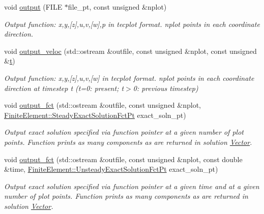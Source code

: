\begin{DoxyCompactItemize}
void \hyperlink{classoomph_1_1GeneralisedNewtonianAxisymmetricNavierStokesEquations_a9aae32c881c1c55c2d20c579bf5438f7}{output} (F\+I\+LE $\ast$file\+\_\+pt, const unsigned \&nplot)
\begin{DoxyCompactList}\small\item\em Output function\+: x,y,\mbox{[}z\mbox{]},u,v,\mbox{[}w\mbox{]},p in tecplot format. nplot points in each coordinate direction. \end{DoxyCompactList}\item 
void \hyperlink{classoomph_1_1GeneralisedNewtonianAxisymmetricNavierStokesEquations_a6d1a6a907d2a90a45c50ef8ced117b6d}{output\+\_\+veloc} (std\+::ostream \&outfile, const unsigned \&nplot, const unsigned \&\hyperlink{cfortran_8h_af6f0bd3dc13317f895c91323c25c2b8f}{t})
\begin{DoxyCompactList}\small\item\em Output function\+: x,y,\mbox{[}z\mbox{]},u,v,\mbox{[}w\mbox{]} in tecplot format. nplot points in each coordinate direction at timestep t (t=0\+: present; t$>$0\+: previous timestep) \end{DoxyCompactList}\item 
void \hyperlink{classoomph_1_1GeneralisedNewtonianAxisymmetricNavierStokesEquations_a7aca4266760477bee257a2509b136686}{output\+\_\+fct} (std\+::ostream \&outfile, const unsigned \&nplot, \hyperlink{classoomph_1_1FiniteElement_a690fd33af26cc3e84f39bba6d5a85202}{Finite\+Element\+::\+Steady\+Exact\+Solution\+Fct\+Pt} exact\+\_\+soln\+\_\+pt)
\begin{DoxyCompactList}\small\item\em Output exact solution specified via function pointer at a given number of plot points. Function prints as many components as are returned in solution \hyperlink{classoomph_1_1Vector}{Vector}. \end{DoxyCompactList}\item 
void \hyperlink{classoomph_1_1GeneralisedNewtonianAxisymmetricNavierStokesEquations_acb92d58063aadbfeff72e1ca134d81aa}{output\+\_\+fct} (std\+::ostream \&outfile, const unsigned \&nplot, const double \&time, \hyperlink{classoomph_1_1FiniteElement_ad4ecf2b61b158a4b4d351a60d23c633e}{Finite\+Element\+::\+Unsteady\+Exact\+Solution\+Fct\+Pt} exact\+\_\+soln\+\_\+pt)
\begin{DoxyCompactList}\small\item\em Output exact solution specified via function pointer at a given time and at a given number of plot points. Function prints as many components as are returned in solution \hyperlink{classoomph_1_1Vector}{Vector}. \end{DoxyCompactList}\item 

\end{DoxyCompactItemize}
